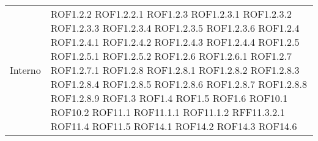 \begin{longtable}{p{2.5cm}!{\VRule[1pt]}p{2.5cm}}
	Interno & ROF1.2.2 \newline ROF1.2.2.1 \newline ROF1.2.3 \newline ROF1.2.3.1 \newline ROF1.2.3.2 \newline ROF1.2.3.3 \newline ROF1.2.3.4 \newline ROF1.2.3.5 \newline ROF1.2.3.6 \newline ROF1.2.4 \newline ROF1.2.4.1 \newline ROF1.2.4.2 \newline ROF1.2.4.3 \newline ROF1.2.4.4 \newline ROF1.2.5 \newline ROF1.2.5.1 \newline ROF1.2.5.2 \newline ROF1.2.6 \newline ROF1.2.6.1 \newline ROF1.2.7 \newline ROF1.2.7.1 \newline ROF1.2.8 \newline ROF1.2.8.1 \newline ROF1.2.8.2 \newline ROF1.2.8.3 \newline ROF1.2.8.4 \newline ROF1.2.8.5 \newline ROF1.2.8.6 \newline ROF1.2.8.7 \newline ROF1.2.8.8 \newline ROF1.2.8.9 \newline ROF1.3 \newline ROF1.4 \newline ROF1.5 \newline ROF1.6 \newline ROF10.1 \newline ROF10.2 \newline ROF11.1 \newline ROF11.1.1 \newline ROF11.1.2 \newline RFF11.3.2.1 \newline ROF11.4 \newline ROF11.5 \newline ROF14.1 \newline ROF14.2 \newline ROF14.3 \newline ROF14.6 \\

\end{longtable}
